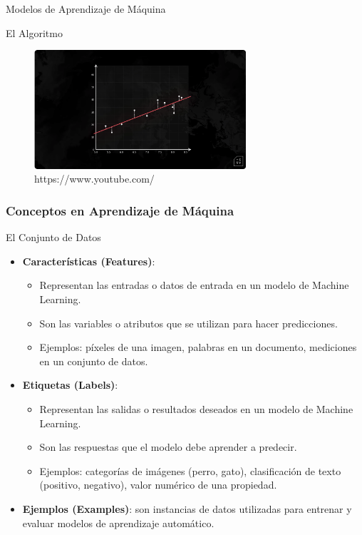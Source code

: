 \documentclass{beamer}
\begin{document}
		\begin{frame}{Modelos de Aprendizaje de Máquina}
		\begin{block}{El Algoritmo}
			\begin{figure}
				\includegraphics[width=0.7\textwidth]{modelo-algoritmo_3}
				\caption{https://www.youtube.com/}
				\centering
			\end{figure}
		\end{block}
		
	\end{frame}

	

\begin{frame}
	\frametitle{Conceptos en Aprendizaje de Máquina}
			\begin{block}{El Conjunto de Datos}
	\begin{itemize}
		\item \textbf{Características (Features)}:
		\begin{itemize}
			\item Representan las entradas o datos de entrada en un modelo de Machine Learning.
			\item Son las variables o atributos que se utilizan para hacer predicciones.
			\item Ejemplos: píxeles de una imagen, palabras en un documento, mediciones en un conjunto de datos.
		\end{itemize}			
		\item \textbf{Etiquetas (Labels)}:
		\begin{itemize}
			\item Representan las salidas o resultados deseados en un modelo de Machine Learning.
			\item Son las respuestas que el modelo debe aprender a predecir.
			\item Ejemplos: categorías de imágenes (perro, gato), clasificación de texto (positivo, negativo), valor numérico de una propiedad.
		\end{itemize}
		\item \textbf{Ejemplos (Examples)}: son instancias de datos utilizadas para entrenar y evaluar modelos de aprendizaje automático.
	\end{itemize}
		\end{block}
\end{frame}
\end{document}
